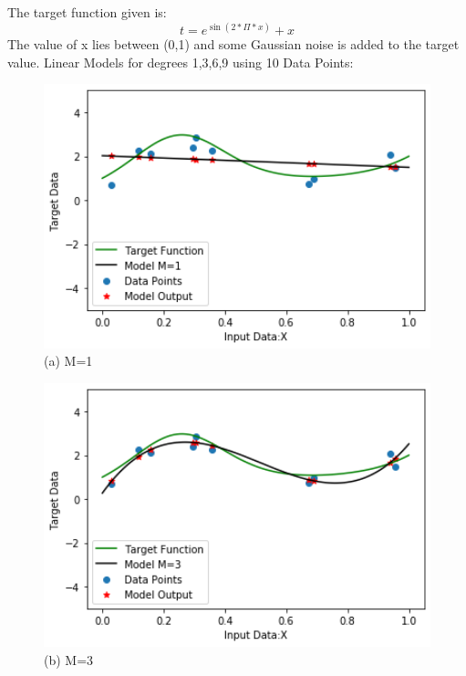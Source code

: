 \documentclass[a4 paper]{article}
\begin{document}
The target function given is: 
\begin{equation}
   t = e^{\sin{(2*\Pi*x)}}+x 
\end{equation}
The value of x lies between (0,1) and some Gaussian noise is added to the target value. 
 Linear Models for degrees 1,3,6,9 using 10 Data Points:
\begin{figure}[!htb]
    \centering
    \begin{minipage}{0.49\textwidth}
        \centering
        \includegraphics[width=1\textwidth]{M=1.png} \\
        (a) M=1
    \end{minipage}\hfill
    \begin{minipage}{0.49\textwidth}
        \centering
        \includegraphics[width=1\textwidth]{M=3.png}\\
        (b) M=3
    \end{minipage}
    \label{fig:l}
\end{figure}
\end{document}
